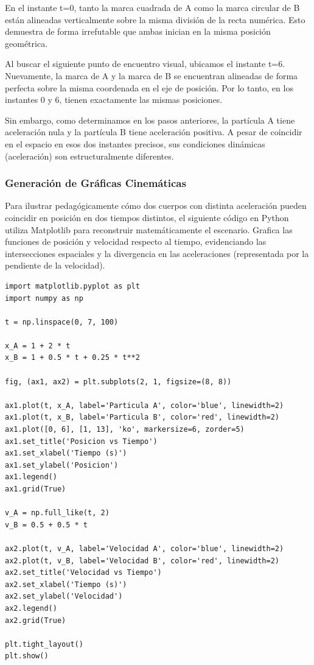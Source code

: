 \documentclass[12pt, a4paper]{article}
\begin{document}
En el instante t=0, tanto la marca cuadrada de A como la marca circular de B están alineadas verticalmente sobre la misma división de la recta numérica. Esto demuestra de forma irrefutable que ambas inician en la misma posición geométrica.

Al buscar el siguiente punto de encuentro visual, ubicamos el instante t=6. Nuevamente, la marca de A y la marca de B se encuentran alineadas de forma perfecta sobre la misma coordenada en el eje de posición. Por lo tanto, en los instantes 0 y 6, tienen exactamente las mismas posiciones. 

Sin embargo, como determinamos en los pasos anteriores, la partícula A tiene aceleración nula y la partícula B tiene aceleración positiva. A pesar de coincidir en el espacio en esos dos instantes precisos, sus condiciones dinámicas (aceleración) son estructuralmente diferentes.

\subsubsection*{Generación de Gráficas Cinemáticas}

Para ilustrar pedagógicamente cómo dos cuerpos con distinta aceleración pueden coincidir en posición en dos tiempos distintos, el siguiente código en Python utiliza Matplotlib para reconstruir matemáticamente el escenario. Grafica las funciones de posición y velocidad respecto al tiempo, evidenciando las intersecciones espaciales y la divergencia en las aceleraciones (representada por la pendiente de la velocidad).

\begin{lstlisting}
import matplotlib.pyplot as plt
import numpy as np

t = np.linspace(0, 7, 100)

x_A = 1 + 2 * t
x_B = 1 + 0.5 * t + 0.25 * t**2

fig, (ax1, ax2) = plt.subplots(2, 1, figsize=(8, 8))

ax1.plot(t, x_A, label='Particula A', color='blue', linewidth=2)
ax1.plot(t, x_B, label='Particula B', color='red', linewidth=2)
ax1.plot([0, 6], [1, 13], 'ko', markersize=6, zorder=5)
ax1.set_title('Posicion vs Tiempo')
ax1.set_xlabel('Tiempo (s)')
ax1.set_ylabel('Posicion')
ax1.legend()
ax1.grid(True)

v_A = np.full_like(t, 2)
v_B = 0.5 + 0.5 * t

ax2.plot(t, v_A, label='Velocidad A', color='blue', linewidth=2)
ax2.plot(t, v_B, label='Velocidad B', color='red', linewidth=2)
ax2.set_title('Velocidad vs Tiempo')
ax2.set_xlabel('Tiempo (s)')
ax2.set_ylabel('Velocidad')
ax2.legend()
ax2.grid(True)

plt.tight_layout()
plt.show()
\end{lstlisting}
\end{document}
